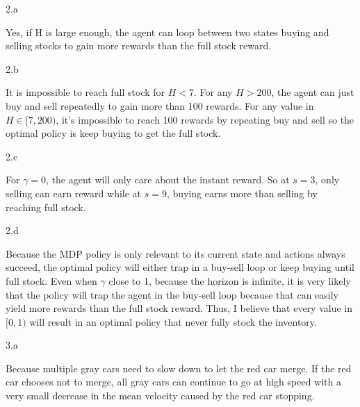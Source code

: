 \LARGE
2.a
\normalsize

\begin{answer}
  Yes, if H is large enough, the agent can loop between two states buying and selling stocks to gain more rewards than the full stock reward.
\end{answer}
\clearpage

\LARGE
2.b
\normalsize

\begin{answer}
  It is impossible to reach full stock for $H < 7$. For any $H > 200$, the agent can just buy and sell repeatedly to gain more than 100 rewards. For any value in $H \in [7, 200)$, it's impossible to reach 100 rewards by repeating buy and sell so the optimal policy is keep buying to get the full stock.
\end{answer}
\clearpage

\LARGE
2.c
\normalsize

\begin{answer}
  For $\gamma = 0$, the agent will only care about the instant reward. So at $s = 3$, only selling can earn reward while at $s = 9$, buying earns more than selling by reaching full stock.
\end{answer}
\clearpage

\LARGE
2.d
\normalsize

\begin{answer}
  Because the MDP policy is only relevant to its current state and actions always succeed, the optimal policy will either trap in a buy-sell loop or keep buying until full stock. Even when $\gamma$ close to 1, because the horizon is infinite, it is very likely that the policy will trap the agent in the buy-sell loop because that can easily yield more rewards than the full stock reward. Thus, I believe that every value in $[0, 1)$ will result in an optimal policy that never fully stock the inventory.
\end{answer}
\clearpage


\LARGE
3.a
\normalsize

\begin{answer}
  Because multiple gray cars need to slow down to let the red car merge. If the red car chooses not to merge, all gray cars can continue to go at high speed with a very small decrease in the mean velocity caused by the red car stopping.
\end{answer}
\clearpage



